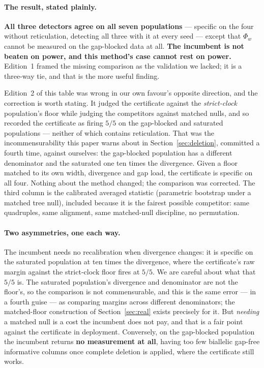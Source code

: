\documentclass[11pt,a4paper]{article}
\theoremstyle{definition}
\theoremstyle{remark}
\begin{document}
\paragraph{The result, stated plainly.} \textbf{All three detectors agree on all
seven populations} --- specific on the four without reticulation, detecting all
three with it at every seed --- except that $\Phi_w$ cannot be measured on the
gap-blocked data at all. \textbf{The incumbent is not beaten on power, and this
method's case cannot rest on power.} Edition~1 framed the missing comparison as
the validation we lacked; it is a three-way tie, and that is the more useful
finding.

Edition~2 of this table was wrong in our own favour's opposite direction, and the
correction is worth stating. It judged the certificate against the
\emph{strict-clock} population's floor while judging the competitors against
matched nulls, and so recorded the certificate as firing $5/5$ on the gap-blocked
and saturated populations --- neither of which contains reticulation. That was the
incommensurability this paper warns about in Section~\ref{sec:deletion},
committed a fourth time, against ourselves: the gap-blocked population has a
different denominator and the saturated one ten times the divergence. Given a
floor matched to its own width, divergence and gap load, the certificate is
specific on all four. Nothing about the method changed; the comparison was
corrected. The third column is the calibrated averaged statistic
(parametric bootstrap under a matched tree null), included because it is the
fairest possible competitor: same quadruples, same alignment, same matched-null
discipline, no permutation.

\paragraph{Two asymmetries, one each way.} The incumbent needs no recalibration
when divergence changes: it is specific on the saturated population at ten times
the divergence, where the certificate's raw margin against the strict-clock floor
fires at $5/5$. We are careful about what that $5/5$ is. The saturated
population's divergence and denominator are not the floor's, so the comparison is
not commensurable, and this is the same error --- in a fourth guise --- as
comparing margins across different denominators; the matched-floor construction
of Section~\ref{sec:real} exists precisely for it. But \emph{needing} a matched
null is a cost the incumbent does not pay, and that is a fair point against the
certificate in deployment. Conversely, on the gap-blocked population the
incumbent returns \textbf{no measurement at all}, having too few biallelic
gap-free informative columns once complete deletion is applied, where the
certificate still works.
\end{document}
